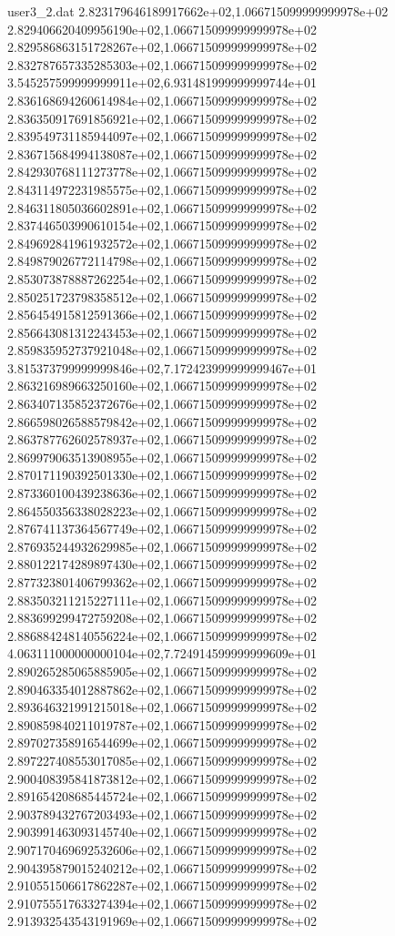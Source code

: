 \begin{filecontents}{user3_2.dat}
2.823179646189917662e+02,1.066715099999999978e+02
2.829406620409956190e+02,1.066715099999999978e+02
2.829586863151728267e+02,1.066715099999999978e+02
2.832787657335285303e+02,1.066715099999999978e+02
3.545257599999999911e+02,6.931481999999999744e+01
2.836168694260614984e+02,1.066715099999999978e+02
2.836350917691856921e+02,1.066715099999999978e+02
2.839549731185944097e+02,1.066715099999999978e+02
2.836715684994138087e+02,1.066715099999999978e+02
2.842930768111273778e+02,1.066715099999999978e+02
2.843114972231985575e+02,1.066715099999999978e+02
2.846311805036602891e+02,1.066715099999999978e+02
2.837446503990610154e+02,1.066715099999999978e+02
2.849692841961932572e+02,1.066715099999999978e+02
2.849879026772114798e+02,1.066715099999999978e+02
2.853073878887262254e+02,1.066715099999999978e+02
2.850251723798358512e+02,1.066715099999999978e+02
2.856454915812591366e+02,1.066715099999999978e+02
2.856643081312243453e+02,1.066715099999999978e+02
2.859835952737921048e+02,1.066715099999999978e+02
3.815373799999999846e+02,7.172423999999999467e+01
2.863216989663250160e+02,1.066715099999999978e+02
2.863407135852372676e+02,1.066715099999999978e+02
2.866598026588579842e+02,1.066715099999999978e+02
2.863787762602578937e+02,1.066715099999999978e+02
2.869979063513908955e+02,1.066715099999999978e+02
2.870171190392501330e+02,1.066715099999999978e+02
2.873360100439238636e+02,1.066715099999999978e+02
2.864550356338028223e+02,1.066715099999999978e+02
2.876741137364567749e+02,1.066715099999999978e+02
2.876935244932629985e+02,1.066715099999999978e+02
2.880122174289897430e+02,1.066715099999999978e+02
2.877323801406799362e+02,1.066715099999999978e+02
2.883503211215227111e+02,1.066715099999999978e+02
2.883699299472759208e+02,1.066715099999999978e+02
2.886884248140556224e+02,1.066715099999999978e+02
4.063111000000000104e+02,7.724914599999999609e+01
2.890265285065885905e+02,1.066715099999999978e+02
2.890463354012887862e+02,1.066715099999999978e+02
2.893646321991215018e+02,1.066715099999999978e+02
2.890859840211019787e+02,1.066715099999999978e+02
2.897027358916544699e+02,1.066715099999999978e+02
2.897227408553017085e+02,1.066715099999999978e+02
2.900408395841873812e+02,1.066715099999999978e+02
2.891654208685445724e+02,1.066715099999999978e+02
2.903789432767203493e+02,1.066715099999999978e+02
2.903991463093145740e+02,1.066715099999999978e+02
2.907170469692532606e+02,1.066715099999999978e+02
2.904395879015240212e+02,1.066715099999999978e+02
2.910551506617862287e+02,1.066715099999999978e+02
2.910755517633274394e+02,1.066715099999999978e+02
2.913932543543191969e+02,1.066715099999999978e+02

\end{filecontents}
